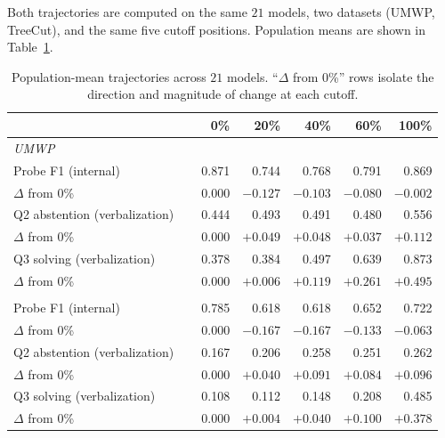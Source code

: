 Both trajectories are computed on the same $21$ models, two datasets
(UMWP, TreeCut), and the same five cutoff positions.
Population means are shown in Table~\ref{tab:traj-popmeans}.

\begin{table}[h]
\centering
\small
\caption{Population-mean trajectories across $21$ models. ``$\Delta$ from 0\%''
rows isolate the direction and magnitude of change at each cutoff.}
\label{tab:traj-popmeans}
\begin{tabular}{lrrrrr}
\toprule
                                 &    0\% &   20\% &   40\% &   60\% &  100\% \\
\midrule
\multicolumn{6}{l}{\emph{UMWP}} \\
\addlinespace[2pt]
Probe F1 (internal)              & 0.871 & 0.744 & 0.768 & 0.791 & 0.869 \\
\quad $\Delta$ from 0\%          & $\phantom{-}0.000$ & $\mathbf{-0.127}$ & $-0.103$ & $-0.080$ & $-0.002$ \\
Q2 abstention (verbalization)    & 0.444 & 0.493 & 0.491 & 0.480 & 0.556 \\
\quad $\Delta$ from 0\%          & $\phantom{-}0.000$ & $\mathbf{+0.049}$ & $+0.048$ & $+0.037$ & $\mathbf{+0.112}$ \\
Q3 solving (verbalization)       & 0.378 & 0.384 & 0.497 & 0.639 & 0.873 \\
\quad $\Delta$ from 0\%          & $\phantom{-}0.000$ & $+0.006$ & $+0.119$ & $+0.261$ & $\mathbf{+0.495}$ \\
\addlinespace[4pt]
\multicolumn{6}{l}{\emph{TreeCut}} \\
\addlinespace[2pt]
Probe F1 (internal)              & 0.785 & 0.618 & 0.618 & 0.652 & 0.722 \\
\quad $\Delta$ from 0\%          & $\phantom{-}0.000$ & $\mathbf{-0.167}$ & $-0.167$ & $-0.133$ & $-0.063$ \\
Q2 abstention (verbalization)    & 0.167 & 0.206 & 0.258 & 0.251 & 0.262 \\
\quad $\Delta$ from 0\%          & $\phantom{-}0.000$ & $\mathbf{+0.040}$ & $+0.091$ & $+0.084$ & $\mathbf{+0.096}$ \\
Q3 solving (verbalization)       & 0.108 & 0.112 & 0.148 & 0.208 & 0.485 \\
\quad $\Delta$ from 0\%          & $\phantom{-}0.000$ & $+0.004$ & $+0.040$ & $+0.100$ & $\mathbf{+0.378}$ \\
\bottomrule
\end{tabular}
\end{table}

